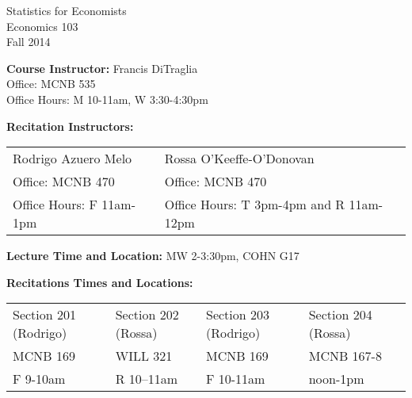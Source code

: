\documentclass[11pt, letterpaper]{article}
\begin{document}
\thispagestyle{plain}

\begin{center}
\Large
\sc
Statistics for Economists\\
\large
Economics 103\\
\large
Fall 2014\\
\end{center}


\normalsize

\noindent \textbf{Course Instructor:} Francis DiTraglia \\
Office: MCNB 535\\
Office Hours: M 10-11am, W 3:30-4:30pm

\medskip


\noindent \textbf{Recitation Instructors:}

\medskip
\noindent


\begin{tabular}{ll}
Rodrigo Azuero Melo & Rossa O'Keeffe-O'Donovan\\
Office: MCNB 470 & Office: MCNB 470\\ 
Office Hours: F 11am-1pm & Office Hours: T 3pm-4pm and R 11am-12pm\\
\end{tabular}

\medskip


 
\noindent \textbf{Lecture Time and Location:} MW 2-3:30pm, COHN G17  

\medskip

\noindent \textbf{Recitations Times and Locations:}
\medskip \noindent

\begin{tabular}{lllll}
	Section 201 (Rodrigo) & Section 202 (Rossa) & Section 203 (Rodrigo) & Section 204 (Rossa)\\
	MCNB 169 & WILL 321 & MCNB 169 & MCNB 167-8 \\ 
	F 9-10am & R 10--11am & F 10-11am & noon-1pm
\end{tabular}
\end{document}

